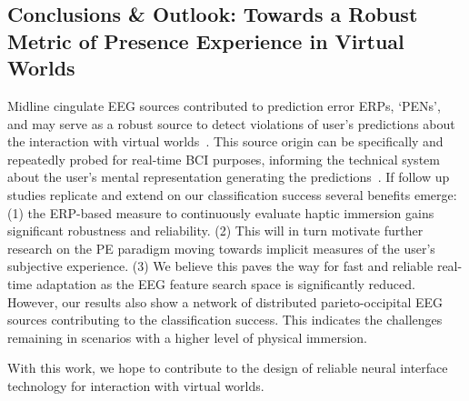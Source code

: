 \subsection{Conclusions \& Outlook: Towards a Robust Metric of Presence Experience in Virtual Worlds}

Midline cingulate EEG sources contributed to prediction error ERPs, `PENs', and may serve as a robust source to detect violations of user's predictions about the interaction with virtual worlds~\cite{Gehrke2019-og, Si-mohammed2020-ru, Zander2016-ed}. This source origin can be specifically and repeatedly probed for real-time BCI purposes, informing the technical system about the user's mental representation generating the predictions~\cite{Krol2020-lj, Zander2016-ed}. If follow up studies replicate and extend on our classification success several benefits emerge: (1) the ERP-based measure to continuously evaluate haptic immersion gains significant robustness and reliability. (2) This will in turn motivate further research on the PE paradigm moving towards implicit measures of the user's subjective experience. (3) We believe this paves the way for fast and reliable real-time adaptation as the EEG feature search space is significantly reduced. However, our results also show a network of distributed parieto-occipital EEG sources contributing to the classification success. This indicates the challenges remaining in scenarios with a higher level of physical immersion. 

With this work, we hope to contribute to the design of reliable neural interface technology for interaction with virtual worlds.




